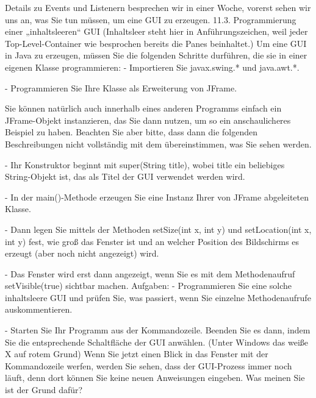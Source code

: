 Details zu Events und Listenern besprechen wir in einer Woche, vorerst sehen wir uns an, was Sie tun müssen, um eine GUI zu erzeugen.
11.3.	Programmierung einer „inhaltsleeren“ GUI
(Inhaltsleer steht hier in Anführungszeichen, weil jeder Top-Level-Container wie besprochen bereits die Panes beinhaltet.)
Um eine GUI in Java zu erzeugen, müssen Sie die folgenden Schritte durführen, die sie in einer eigenen Klasse programmieren:
-	Importieren Sie javax.swing.* und java.awt.*.

-	Programmieren Sie Ihre Klasse als Erweiterung von JFrame. 

Sie können natürlich auch innerhalb eines anderen Programms einfach ein JFrame-Objekt instanzieren, das Sie dann nutzen, um so ein anschaulicheres Beispiel zu haben. Beachten Sie aber bitte, dass dann die folgenden Beschreibungen nicht vollständig mit dem übereinstimmen, was Sie sehen werden.

-	Ihr Konstruktor beginnt mit super(String title), wobei title ein beliebiges String-Objekt ist, das als Titel der GUI verwendet werden wird.

-	In der main()-Methode erzeugen Sie eine Instanz Ihrer von JFrame abgeleiteten Klasse.

-	Dann legen Sie mittels der Methoden setSize(int x, int y) und setLocation(int x, int y) fest, wie groß das Fenster ist und an welcher Position des Bildschirms es erzeugt (aber noch nicht angezeigt) wird.

-	Das Fenster wird erst dann angezeigt, wenn Sie es mit dem Methodenaufruf setVisible(true) sichtbar machen.
Aufgaben:
-	Programmieren Sie eine solche inhaltsleere GUI und prüfen Sie, was passiert, wenn Sie einzelne Methodenaufrufe auskommentieren.

-	Starten Sie Ihr Programm aus der Kommandozeile. Beenden Sie es dann, indem Sie die entsprechende Schaltfläche der GUI anwählen. (Unter Windows das weiße X auf rotem Grund) Wenn Sie jetzt einen Blick in das Fenster mit der Kommandozeile werfen, werden Sie sehen, dass der GUI-Prozess immer noch läuft, denn dort können Sie keine neuen Anweisungen eingeben. Was meinen Sie ist der Grund dafür? 

